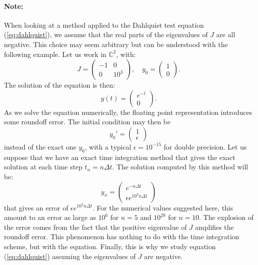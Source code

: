         \paragraph{Note:}
        When looking at a method applied to the Dahlquist test equation (\ref{eq:dahlquist}), we assume that the real parts of the eigenvalues of $J$ are all negative.
        This choice may seem arbitrary but can be understood with the following example.
        Let us work in $\mathbb{C}^2$, with:
        \begin{equation}
          J = \begin{pmatrix} -1 & 0 \\ 0 & 10^3 \end{pmatrix}, \quad y_0 = \begin{pmatrix} 1 \\ 0 \end{pmatrix} .
        \end{equation}
        The solution of the equation is then:
        \begin{equation}
          y\left(t\right) = \begin{pmatrix} e^{-t} \\ 0 \end{pmatrix} .
        \end{equation}
        As we solve the equation numerically, the floating point representation introduces some roundoff error.
        The initial condition may then be
        \begin{equation}
          y_0' = \begin{pmatrix} 1 \\ \epsilon \end{pmatrix}
        \end{equation}
        instead of the exact one $y_0$, with a typical $\epsilon = 10^{-15}$ for double precision.
        Let us suppose that we have an exact time integration method that gives the exact solution at each time step $t_n = n\Delta t$.
        The solution computed by this method will be:
        \begin{equation}
          y_n = \begin{pmatrix} e^{-n\Delta t} \\ \epsilon e^{10^3 n \Delta t} \end{pmatrix}
        \end{equation}
        that gives an error of $\epsilon e^{10^3 n\Delta t}$.
        For the numerical values suggested here, this amount to an error as large as $10^6$ for $n = 5$ and $10^{28}$ for $n = 10$.
        The explosion of the error comes from the fact that the positive eigenvalue of $J$ amplifies the roundoff error.
        This phenomenon has nothing to do with the time integration scheme, but with the equation.
        Finally, this is why we study equation (\ref{eq:dahlquist}) assuming the eigenvalues of $J$ are negative.

